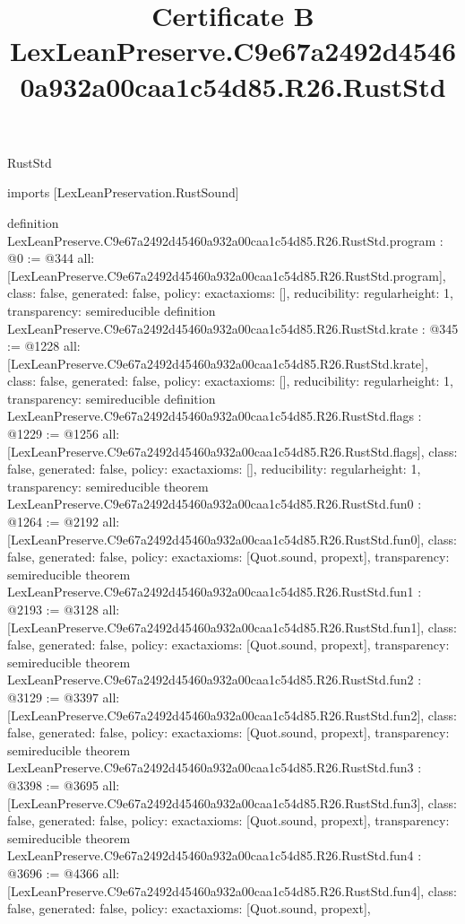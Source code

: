 \begin{lexlean}{RustStd}
\title{Certificate B LexLeanPreserve.C9e67a2492d45460a932a00caa1c54d85.R26.RustStd}
\begin{coremodule}
imports [LexLeanPreservation.RustSound]

definition LexLeanPreserve.C9e67a2492d45460a932a00caa1c54d85.R26.RustStd.program : @0 := @344 {
  all: [LexLeanPreserve.C9e67a2492d45460a932a00caa1c54d85.R26.RustStd.program],
  class: false,
  generated: false,
  policy: exact{axioms: []},
  reducibility: regular{height: 1},
  transparency: semireducible
}
definition LexLeanPreserve.C9e67a2492d45460a932a00caa1c54d85.R26.RustStd.krate : @345 := @1228 {
  all: [LexLeanPreserve.C9e67a2492d45460a932a00caa1c54d85.R26.RustStd.krate],
  class: false,
  generated: false,
  policy: exact{axioms: []},
  reducibility: regular{height: 1},
  transparency: semireducible
}
definition LexLeanPreserve.C9e67a2492d45460a932a00caa1c54d85.R26.RustStd.flags : @1229 := @1256 {
  all: [LexLeanPreserve.C9e67a2492d45460a932a00caa1c54d85.R26.RustStd.flags],
  class: false,
  generated: false,
  policy: exact{axioms: []},
  reducibility: regular{height: 1},
  transparency: semireducible
}
theorem LexLeanPreserve.C9e67a2492d45460a932a00caa1c54d85.R26.RustStd.fun0 : @1264 := @2192 {
  all: [LexLeanPreserve.C9e67a2492d45460a932a00caa1c54d85.R26.RustStd.fun0],
  class: false,
  generated: false,
  policy: exact{axioms: [Quot.sound, propext]},
  transparency: semireducible
}
theorem LexLeanPreserve.C9e67a2492d45460a932a00caa1c54d85.R26.RustStd.fun1 : @2193 := @3128 {
  all: [LexLeanPreserve.C9e67a2492d45460a932a00caa1c54d85.R26.RustStd.fun1],
  class: false,
  generated: false,
  policy: exact{axioms: [Quot.sound, propext]},
  transparency: semireducible
}
theorem LexLeanPreserve.C9e67a2492d45460a932a00caa1c54d85.R26.RustStd.fun2 : @3129 := @3397 {
  all: [LexLeanPreserve.C9e67a2492d45460a932a00caa1c54d85.R26.RustStd.fun2],
  class: false,
  generated: false,
  policy: exact{axioms: [Quot.sound, propext]},
  transparency: semireducible
}
theorem LexLeanPreserve.C9e67a2492d45460a932a00caa1c54d85.R26.RustStd.fun3 : @3398 := @3695 {
  all: [LexLeanPreserve.C9e67a2492d45460a932a00caa1c54d85.R26.RustStd.fun3],
  class: false,
  generated: false,
  policy: exact{axioms: [Quot.sound, propext]},
  transparency: semireducible
}
theorem LexLeanPreserve.C9e67a2492d45460a932a00caa1c54d85.R26.RustStd.fun4 : @3696 := @4366 {
  all: [LexLeanPreserve.C9e67a2492d45460a932a00caa1c54d85.R26.RustStd.fun4],
  class: false,
  generated: false,
  policy: exact{axioms: [Quot.sound, propext]},
}
\end{coremodule}
\end{lexlean}
